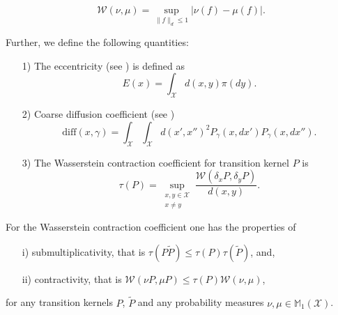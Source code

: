 \begin{theorem}
\label{thm:kantorovich_rubenstein_duality}
\[
\mathcal{W}(\nu, \mu) = \sup_{ \| f \|_d \leq 1} \left\vert \nu(f) - \mu(f) \right\vert.
\]
\end{theorem}

Further, we define the following quantities: 
\begin{itemize}
\item[1)] The eccentricity (see \cite{joulin2010curvature}) is defined as 
\[
E(x) = \int_\mathcal{X} d(x, y) \pi(dy).
\] 
\item[2)] Coarse diffusion coefficient (see \cite{joulin2010curvature})
\[
\mathrm{diff}(x, \gamma) = \int_\mathcal{X} \int_\mathcal{X} d(x', x'')^2 P_{\gamma}(x, dx') P_{\gamma}(x, dx'').
\]
\item[3)] The Wasserstein contraction coefficient  for transition kernel $P$ is 
\[
\tau(P) = \sup_{\substack{x, y \in \mathcal{X} \\ x \neq y}} \frac{\mathcal{W} (\delta_x P, \delta_y P)}{d(x, y)}.
\]
\end{itemize}

\begin{proposition}
 For the Wasserstein contraction coefficient one has the properties of
\begin{itemize}
\item[i)] submultiplicativity, that is $\tau(P \tilde{P} ) \leq \tau(P) \tau(\tilde{P})$, and,
\item[ii)] contractivity, that is $\mathcal{W}(\nu P , \mu P) \leq \tau(P) \mathcal{W}(\nu, \mu)$,
\end{itemize}
for any transition kernels $P$, $\tilde{P}$ and any probability measures $\nu, \mu \in \mathbb{M}_1(\mathcal{X})$.  
\end{proposition}